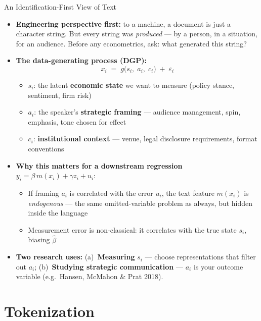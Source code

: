 \begin{frame}{An Identification-First View of Text}
\begin{itemize}
\item \textbf{Engineering perspective first:} to a machine, a document is just a character string. But every string was \emph{produced} --- by a person, in a situation, for an audience. Before any econometrics, ask: what generated this string?

\medskip
\item \textbf{The data-generating process (DGP):}
\[
   x_i \;=\; g\bigl(s_i,\; a_i,\; c_i\bigr) \;+\; \varepsilon_i
\]
\begin{itemize}
    \item $s_i$: the latent \textbf{economic state} we want to measure (policy stance, sentiment, firm risk)
    \item $a_i$: the speaker's \textbf{strategic framing} --- audience management, spin, emphasis, tone chosen for effect
    \item $c_i$: \textbf{institutional context} --- venue, legal disclosure requirements, format conventions
\end{itemize}

\medskip
\item \textbf{Why this matters for a downstream regression} $y_i = \beta\,m(x_i) + \gamma z_i + u_i$:
\begin{itemize}
    \item If framing $a_i$ is correlated with the error $u_i$, the text feature $m(x_i)$ is \emph{endogenous} --- the same omitted-variable problem as always, but hidden inside the language
    \item Measurement error is non-classical: it correlates with the true state $s_i$, biasing $\hat\beta$
\end{itemize}

\medskip
\item \textbf{Two research uses:} (a)~\textbf{Measuring} $s_i$ --- choose representations that filter out $a_i$; (b)~\textbf{Studying strategic communication} --- $a_i$ is your outcome variable (e.g.\ Hansen, McMahon \& Prat 2018).
\end{itemize}
\end{frame}

\section{Tokenization}

